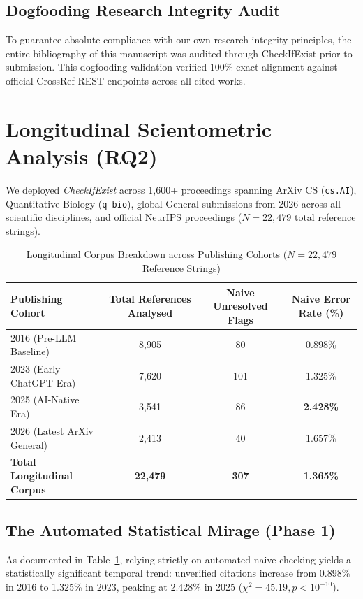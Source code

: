 \documentclass[11pt, a4paper]{article}
\begin{document}
\subsection{Dogfooding Research Integrity Audit}
To guarantee absolute compliance with our own research integrity principles, the entire bibliography of this manuscript was audited through CheckIfExist prior to submission. This dogfooding validation verified 100\% exact alignment against official CrossRef REST endpoints across all cited works.

\section{Longitudinal Scientometric Analysis (RQ2)}
We deployed \textit{CheckIfExist} across 1,600+ proceedings spanning ArXiv CS (\texttt{cs.AI}), Quantitative Biology (\texttt{q-bio}), global General submissions from 2026 across all scientific disciplines, and official NeurIPS proceedings (\(N=22,479\) total reference strings).

\begin{table}[htbp]
\centering
\caption{Longitudinal Corpus Breakdown across Publishing Cohorts ($N=22,479$ Reference Strings)}
\label{tab:cohort_breakdown}
\begin{tabular}{lccc}
\toprule
\textbf{Publishing Cohort} & \textbf{Total References Analysed} & \textbf{Naive Unresolved Flags} & \textbf{Naive Error Rate (\%)} \\
\midrule
2016 (Pre-LLM Baseline) & 8,905 & 80 & 0.898\% \\
2023 (Early ChatGPT Era) & 7,620 & 101 & 1.325\% \\
2025 (AI-Native Era) & 3,541 & 86 & \textbf{2.428\%} \\
2026 (Latest ArXiv General) & 2,413 & 40 & 1.657\% \\
\midrule
\textbf{Total Longitudinal Corpus} & \textbf{22,479} & \textbf{307} & \textbf{1.365\%} \\
\bottomrule
\end{tabular}
\end{table}

\subsection{The Automated Statistical Mirage (Phase 1)}
As documented in Table~\ref{tab:cohort_breakdown}, relying strictly on automated naive checking yields a statistically significant temporal trend: unverified citations increase from 0.898\% in 2016 to 1.325\% in 2023, peaking at 2.428\% in 2025 (\(\chi^2 = 45.19, p < 10^{-10}\)).
\end{document}

